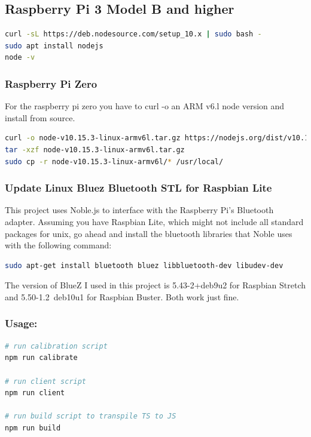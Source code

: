 \documentclass[a4paper, oneside]{ipsreport}
\begin{document}
\subsection*{Raspberry Pi 3 Model B and higher}
\begin{lstlisting}[language=bash]
curl -sL https://deb.nodesource.com/setup_10.x | sudo bash -
sudo apt install nodejs
node -v
\end{lstlisting}

\subsubsection*{Raspberry Pi Zero}
For the raspberry pi zero you have to curl -o an ARM v6.l node version and install from source.
\begin{lstlisting}[language=bash]
curl -o node-v10.15.3-linux-armv6l.tar.gz https://nodejs.org/dist/v10.15.3/node-v10.15.3-linux-armv6l.tar.gz
tar -xzf node-v10.15.3-linux-armv6l.tar.gz
sudo cp -r node-v10.15.3-linux-armv6l/* /usr/local/
\end{lstlisting}

\subsubsection*{Update Linux Bluez Bluetooth STL for Raspbian Lite}
This project uses Noble.js to interface with the Raspberry Pi's Bluetooth adapter. Assuming you have Raspbian Lite, which might not include all standard packages for unix, go ahead and install the bluetooth libraries that Noble uses with the following command:
\begin{lstlisting}[language=bash]
sudo apt-get install bluetooth bluez libbluetooth-dev libudev-dev
\end{lstlisting}

The version of BlueZ I used in this project is 5.43-2+deb9u2 for Raspbian Stretch and 5.50-1.2~deb10u1 for Raspbian Buster. Both work just fine.

\subsubsection*{Usage:}
\begin{lstlisting}[language=bash]
# run calibration script
npm run calibrate

# run client script
npm run client

# run build script to transpile TS to JS
npm run build
\end{lstlisting}
\end{document}
